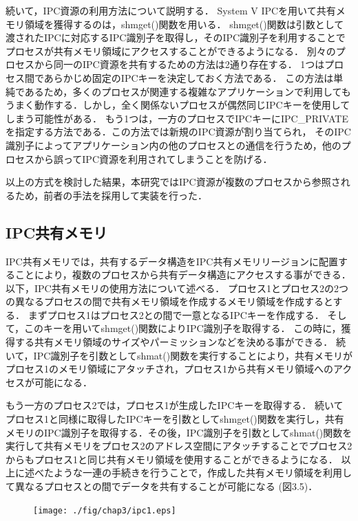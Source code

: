 続いて，IPC資源の利用方法について説明する．
System V IPCを用いて共有メモリ領域を獲得するのは，shmget()関数を用いる．
shmget()関数は引数として渡されたIPCに対応するIPC識別子を取得し，そのIPC識別子を利用することでプロセスが共有メモリ領域にアクセスすることができるようになる．
別々のプロセスから同一のIPC資源を共有するための方法は2通り存在する．
1つはプロセス間であらかじめ固定のIPCキーを決定しておく方法である．
この方法は単純であるため，多くのプロセスが関連する複雑なアプリケーションで利用してもうまく動作する．しかし，全く関係ないプロセスが偶然同じIPCキーを使用してしまう可能性がある．
もう1つは，一方のプロセスでIPCキーにIPC\_PRIVATEを指定する方法である．この方法では新規のIPC資源が割り当てられ， そのIPC識別子によってアプリケーション内の他のプロセスとの通信を行うため，他のプロセスから誤ってIPC資源を利用されてしまうことを防げる．

以上の方式を検討した結果，本研究ではIPC資源が複数のプロセスから参照されるため，前者の手法を採用して実装を行った．

\subsection*{IPC共有メモリ}

IPC共有メモリでは，共有するデータ構造をIPC共有メモリリージョンに配置することにより，複数のプロセスから共有データ構造にアクセスする事ができる．
以下，IPC共有メモリの使用方法について述べる．
プロセス1とプロセス2の2つの異なるプロセスの間で共有メモリ領域を作成するメモリ領域を作成するとする．
まずプロセス1はプロセス2との間で一意となるIPCキーを作成する．
そして，このキーを用いてshmget()関数によりIPC識別子を取得する．
この時に，獲得する共有メモリ領域のサイズやパーミッションなどを決める事ができる．
続いて，IPC識別子を引数としてshmat()関数を実行することにより，共有メモリがプロセス1のメモリ領域にアタッチされ，プロセス1から共有メモリ領域へのアクセスが可能になる．

もう一方のプロセス2では，プロセス1が生成したIPCキーを取得する．
続いてプロセス1と同様に取得したIPCキーを引数としてshmget()関数を実行し，共有メモリのIPC識別子を取得する．その後，IPC識別子を引数としてshmat()関数を実行して共有メモリをプロセス2のアドレス空間にアタッチすることでプロセス2からもプロセス1と同じ共有メモリ領域を使用することができるようになる．
以上に述べたような一連の手続きを行うことで，作成した共有メモリ領域を利用して異なるプロセスとの間でデータを共有することが可能になる (図3.5)．

\begin{figure}[H]
    \hspace*{\fill}
    \texttt{[image: ./fig/chap3/ipc1.eps]}
    \hspace*{\fill}
    
\end{figure}

